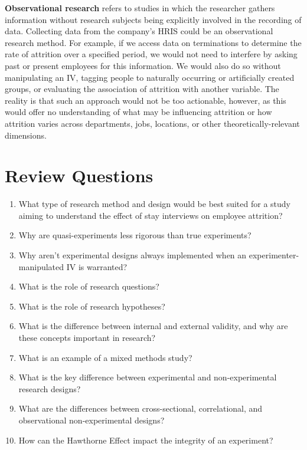\documentclass[
]{book}
\begin{document}
\textbf{Observational research} refers to studies in which the researcher gathers information without research subjects being explicitly involved in the recording of data. Collecting data from the company's HRIS could be an observational research method. For example, if we access data on terminations to determine the rate of attrition over a specified period, we would not need to interfere by asking past or present employees for this information. We would also do so without manipulating an IV, tagging people to naturally occurring or artificially created groups, or evaluating the association of attrition with another variable. The reality is that such an approach would not be too actionable, however, as this would offer no understanding of what may be influencing attrition or how attrition varies across departments, jobs, locations, or other theoretically-relevant dimensions.

\hypertarget{review-questions-3}{%
\section{Review Questions}\label{review-questions-3}}

\begin{enumerate}
\def\labelenumi{\arabic{enumi}.}
\item
  What type of research method and design would be best suited for a study aiming to understand the effect of stay interviews on employee attrition?
\item
  Why are quasi-experiments less rigorous than true experiments?
\item
  Why aren't experimental designs always implemented when an experimenter-manipulated IV is warranted?
\item
  What is the role of research questions?
\item
  What is the role of research hypotheses?
\item
  What is the difference between internal and external validity, and why are these concepts important in research?
\item
  What is an example of a mixed methods study?
\item
  What is the key difference between experimental and non-experimental research designs?
\item
  What are the differences between cross-sectional, correlational, and observational non-experimental designs?
\item
  How can the Hawthorne Effect impact the integrity of an experiment?
\end{enumerate}
\end{document}
